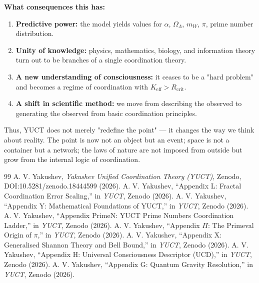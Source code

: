\documentclass[12pt,a4paper]{article}
\newcommand{\Keff}{K_{\mathrm{eff}}}
\newcommand{\Rcrit}{R_{\mathrm{crit}}}
\begin{document}
	\medskip
	\textbf{What consequences this has:}
	\begin{enumerate}
		\item \textbf{Predictive power:} the model yields values for \(\alpha\), \(\Omega_\Lambda\), \(m_W\), \(\pi\), prime number distribution.
		\item \textbf{Unity of knowledge:} physics, mathematics, biology, and information theory turn out to be branches of a single coordination theory.
		\item \textbf{A new understanding of consciousness:} it ceases to be a "hard problem" and becomes a regime of coordination with \(\Keff > \Rcrit\).
		\item \textbf{A shift in scientific method:} we move from describing the observed to generating the observed from basic coordination principles.
	\end{enumerate}
	
	\medskip
	Thus, YUCT does not merely "redefine the point" — it changes the way we think about reality. The point is now not an object but an event; space is not a container but a network; the laws of nature are not imposed from outside but grow from the internal logic of coordination.
	
	\begin{thebibliography}{99}
		 A. V. Yakushev, \emph{Yakushev Unified Coordination Theory (YUCT)}, Zenodo, DOI:10.5281/zenodo.18444599 (2026).
		 A. V. Yakushev, ``Appendix L: Fractal Coordination Error Scaling,'' in \emph{YUCT}, Zenodo (2026).
		 A. V. Yakushev, ``Appendix Y: Mathematical Foundations of YUCT,'' in \emph{YUCT}, Zenodo (2026).
		 A. V. Yakushev, ``Appendix PrimeN: YUCT Prime Numbers Coordination Ladder,'' in \emph{YUCT}, Zenodo (2026).
		 A. V. Yakushev, ``Appendix \(\Pi\): The Primeval Origin of \(\pi\),'' in \emph{YUCT}, Zenodo (2026).
		 A. V. Yakushev, ``Appendix X: Generalised Shannon Theory and Bell Bound,'' in \emph{YUCT}, Zenodo (2026).
		 A. V. Yakushev, ``Appendix H: Universal Consciousness Descriptor (UCD),'' in \emph{YUCT}, Zenodo (2026).
		 A. V. Yakushev, ``Appendix G: Quantum Gravity Resolution,'' in \emph{YUCT}, Zenodo (2026).
	\end{thebibliography}
	
\end{document}
